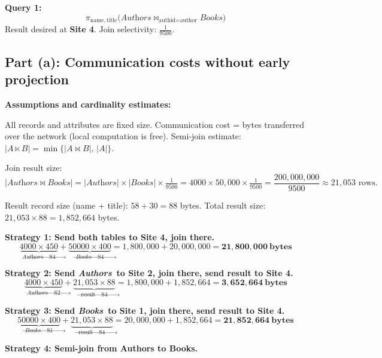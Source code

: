 \documentclass[a4paper,11pt]{article}
\newcommand{\join}{\mathbin{\bowtie}}
\newcommand{\lsj}{\mathbin{\ltimes}}   %
\newcommand{\Authors}{\textit{Authors}}
\newcommand{\Books}{\textit{Books}}
\begin{document}
\textbf{Query 1:}
\[
  \pi_{\text{name},\,\text{title}}\!\bigl(\Authors \join_{\text{authid}=\text{author}} \Books\bigr)
\]
Result desired at \textbf{Site 4}. Join selectivity: $\tfrac{1}{9500}$.

\subsection*{Part (a): Communication costs without early projection}

\textbf{Assumptions and cardinality estimates:}

All records and attributes are fixed size. Communication cost = bytes transferred over the network (local computation is free). Semi-join estimate: $|A \lsj B| = \min\{|A \join B|,\, |A|\}$.

Join result size:
\[
  |\Authors \join \Books| = |\Authors| \times |\Books| \times \tfrac{1}{9500}
  = 4000 \times 50{,}000 \times \tfrac{1}{9500} = \frac{200{,}000{,}000}{9500} \approx 21{,}053 \text{ rows.}
\]

Result record size (name + title): $58 + 30 = 88$ bytes. Total result size: $21{,}053 \times 88 = 1{,}852{,}664$ bytes.

\medskip

\textbf{Strategy 1: Send both tables to Site 4, join there.}
\[
  \underbrace{4000 \times 450}_{\Authors \to \text{S4}} +
  \underbrace{50000 \times 400}_{\Books \to \text{S4}}
  = 1{,}800{,}000 + 20{,}000{,}000 = \mathbf{21{,}800{,}000\ \text{bytes}}
\]

\medskip

\textbf{Strategy 2: Send \Authors\ to Site 2, join there, send result to Site 4.}
\[
  \underbrace{4000 \times 450}_{\Authors \to \text{S2}} +
  \underbrace{21{,}053 \times 88}_{\text{result} \to \text{S4}}
  = 1{,}800{,}000 + 1{,}852{,}664 = \mathbf{3{,}652{,}664\ \text{bytes}}
\]

\medskip

\textbf{Strategy 3: Send \Books\ to Site 1, join there, send result to Site 4.}
\[
  \underbrace{50000 \times 400}_{\Books \to \text{S1}} +
  \underbrace{21{,}053 \times 88}_{\text{result} \to \text{S4}}
  = 20{,}000{,}000 + 1{,}852{,}664 = \mathbf{21{,}852{,}664\ \text{bytes}}
\]

\medskip

\textbf{Strategy 4: Semi-join from Authors to Books.}
\end{document}
